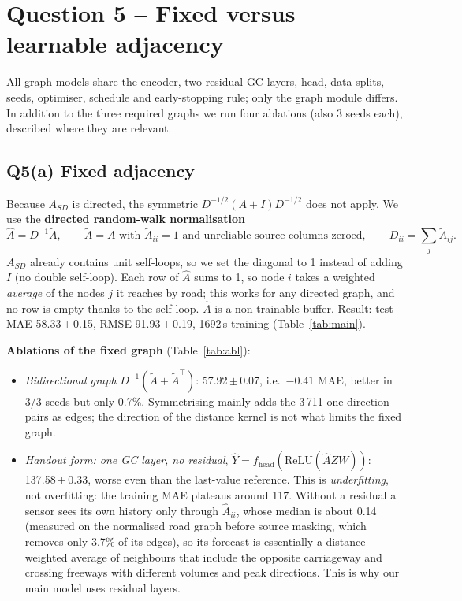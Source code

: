 \documentclass[11pt,a4paper]{article}
\newcommand{\sd}[2]{#1{\scriptsize\,$\scriptstyle\pm$\,#2}}
\begin{document}
\section{Question 5 -- Fixed versus learnable adjacency}
All graph models share the encoder, two residual GC layers, head, data splits, seeds, optimiser, schedule and
early-stopping rule; only the graph module differs. In addition to the three required graphs we run four ablations
(also 3 seeds each), described where they are relevant.

\subsection{Q5(a) Fixed adjacency}
Because $A_{SD}$ is directed, the symmetric $D^{-1/2}(A+I)D^{-1/2}$ does not apply. We use the \textbf{directed
random-walk normalisation}
\[
  \hat A=D^{-1}\tilde A,\qquad \tilde A=A\text{ with } \tilde A_{ii}=1 \text{ and unreliable source columns zeroed},\qquad D_{ii}=\textstyle\sum_j\tilde A_{ij}.
\]
$A_{SD}$ already contains unit self-loops, so we set the diagonal to 1 instead of adding $I$ (no double self-loop). Each
row of $\hat A$ sums to 1, so node $i$ takes a weighted \emph{average} of the nodes $j$ it reaches by road; this works
for any directed graph, and no row is empty thanks to the self-loop. $\hat A$ is a non-trainable buffer.
Result: test MAE \sd{58.33}{0.15}, RMSE \sd{91.93}{0.19}, 1692\,s training (Table~\ref{tab:main}).

\textbf{Ablations of the fixed graph} (Table~\ref{tab:abl}):
\begin{itemize}
\item \emph{Bidirectional graph} $D^{-1}(\tilde A+\tilde A^\top)$: \sd{57.92}{0.07}, i.e.\ $-0.41$ MAE, better in 3/3 seeds
but only 0.7\%. Symmetrising mainly adds the 3\,711 one-direction pairs as edges; the direction of the distance kernel is
not what limits the fixed graph.
\item \emph{Handout form: one GC layer, no residual}, $\hat Y=f_{\text{head}}(\mathrm{ReLU}(\hat AZW))$: \sd{137.58}{0.33},
worse even than the last-value reference. This is \emph{underfitting}, not overfitting: the training MAE plateaus around 117.
Without a residual a sensor sees its own history only through $\hat A_{ii}$, whose median is about 0.14 (measured on the
normalised road graph before source masking, which removes only 3.7\% of its edges), so its forecast is essentially a distance-weighted average of neighbours that include the opposite
carriageway and crossing freeways with different volumes and peak directions. This is why our main model uses residual layers.
\end{itemize}
\end{document}
